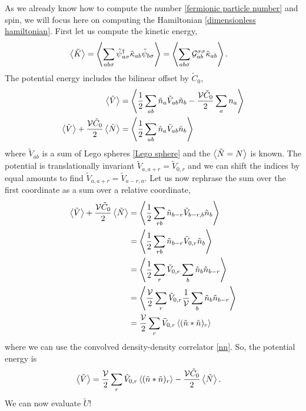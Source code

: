As we already know how to compute the number \eqref{fermionic particle number} and spin, we will focus here on computing the Hamiltonian \eqref{dimensionless hamiltonian}.
First let us compute the kinetic energy,
\begin{align}
	\left\langle \tilde{K} \right\rangle
	&=
	\left\langle  \sum_{ab\sigma} \tilde{\psi}{}^{\dagger}_{a\sigma} \tilde{\kappa}_{ab} \tilde{\psi}_{b\sigma}  \right\rangle
	=
	\left\langle  \sum_{ab\sigma} \mathcal{G}^{\sigma \sigma}_{ab} \tilde{\kappa}_{ab}  \right\rangle.
\end{align}
The potential energy includes the bilinear offset by $\tilde{C}_0$,
\begin{align}
	\left\langle \tilde{V} \right\rangle
	&=
	\left\langle  \frac{1}{2} \sum_{ab} \tilde{n}_a \tilde{V}_{ab} \tilde{n}_b - \frac{\mathcal{V} \tilde{C}_0}{2}\sum_{a} n_a  \right\rangle
	\nonumber\\
	\left\langle \tilde{V} \right\rangle
	+ \frac{\mathcal{V} \tilde{C}_0}{2} \left\langle \tilde{N} \right\rangle
	&=
	\left\langle  \frac{1}{2} \sum_{ab} \tilde{n}_a \tilde{V}_{ab} \tilde{n}_b  \right\rangle
\end{align}
where $\tilde{V}_{ab}$ is a sum of Lego spheres \eqref{Lego sphere} and the $\left\langle \tilde{N}=N \right\rangle$ is known.
The potential is translationally invariant $\tilde{V}_{a,a+r} = \tilde{V}_{0,r}$ and we can shift the indices by equal amounts to find $\tilde{V}_{a,a+r}=\tilde{V}_{a-r,a}$.
Let us now rephrase the sum over the first coordinate as a sum over a relative coordinate,
\begin{align}
	\left\langle \tilde{V} \right\rangle
	+ \frac{\mathcal{V} \tilde{C}_0}{2} \left\langle \tilde{N} \right\rangle
	&=
	\left\langle  \frac{1}{2} \sum_{rb} \tilde{n}_{b-r} \tilde{V}_{b-r,b} \tilde{n}_b  \right\rangle
	\nonumber\\
	&=
	\left\langle  \frac{1}{2} \sum_{rb} \tilde{n}_{b-r} \tilde{V}_{0,r} \tilde{n}_b  \right\rangle
	\nonumber\\
	&=
	\left\langle  \frac{1}{2} \sum_{r} \tilde{V}_{0,r} \sum_b \tilde{n}_b \tilde{n}_{b-r}  \right\rangle
	\nonumber\\
	&=
	\left\langle  \frac{\mathcal{V}}{2} \sum_{r} \tilde{V}_{0,r} \frac{1}{\mathcal{V}} \sum_b \tilde{n}_b \tilde{n}_{b-r}  \right\rangle
	\nonumber\\
	&=
	\frac{\mathcal{V}}{2} \sum_{r} \tilde{V}_{0,r} \left\langle  (\tilde{n}*\tilde{n})_r  \right\rangle
\end{align}
where we can use the convolved density-density correlator \eqref{nn}.
So, the potential energy is
\begin{align}
	\left\langle \tilde{V} \right\rangle
	&=
	\frac{\mathcal{V}}{2} \sum_{r} \tilde{V}_{0,r} \left\langle  (\tilde{n}*\tilde{n})_r  \right\rangle
	- \frac{\mathcal{V} \tilde{C}_0}{2} \left\langle \tilde{N} \right\rangle.
\end{align}
We can now evaluate $\tilde{U}$!


